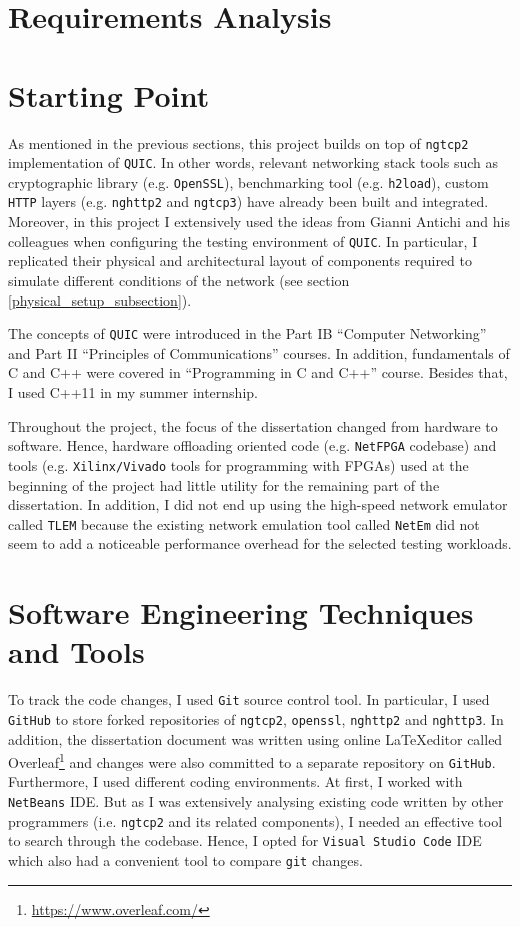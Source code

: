 \documentclass[12pt,a4paper,twoside,openright]{report}
\begin{document}
\section{Requirements Analysis}


\section{Starting Point}
As mentioned in the previous sections, this project builds on top of \texttt{ngtcp2} implementation of \texttt{QUIC}.
In other words, relevant networking stack tools such as cryptographic library (e.g. \texttt{OpenSSL}), benchmarking tool (e.g. \texttt{h2load}), custom \texttt{HTTP} layers (e.g. \texttt{nghttp2} and \texttt{ngtcp3}) have already been built and integrated. 
Moreover, in this project I extensively used the ideas from  Gianni Antichi and his colleagues \cite{Making_QUIC_Quicker} when configuring the testing environment of \texttt{QUIC}.
In particular, I replicated their physical and architectural layout of components required to simulate different conditions of the network (see section \ref{physical_setup_subsection}).

The concepts of \texttt{QUIC} were introduced in the Part IB \enquote{Computer Networking} and Part II \enquote{Principles of Communications} courses.
In addition, fundamentals of C and C++ were covered in \enquote{Programming in C and C++} course. 
Besides that, I used C++11 in my summer internship.

Throughout the project, the focus of the dissertation changed from hardware to software.
Hence, hardware offloading oriented code (e.g. \texttt{NetFPGA} codebase) and tools (e.g. \texttt{Xilinx/Vivado} tools for programming with FPGAs) used at the beginning of the project had little utility for the remaining part of the dissertation.
In addition, I did not end up using the high-speed network emulator called \texttt{TLEM} \cite{TLEM_tool} because the existing network emulation tool called \texttt{NetEm} did not seem to add a noticeable performance overhead for the selected testing workloads.


\section{Software Engineering Techniques and Tools}
    To track the code changes, I used \texttt{Git} source control tool.
    In particular, I used \texttt{GitHub} to store forked repositories of \texttt{ngtcp2}, \texttt{openssl}, \texttt{nghttp2} and \texttt{nghttp3}.
    In addition, the dissertation document was written using online \LaTeX  editor called Overleaf\footnote{\url{https://www.overleaf.com/}} and changes were also committed to a separate repository on \texttt{GitHub}.
    Furthermore, I used different coding environments.
    At first, I worked with \texttt{NetBeans} IDE.
    But as I was extensively analysing existing code written by other programmers (i.e. \texttt{ngtcp2} and its related components), I needed an effective tool to search through the codebase.
    Hence, I opted for \texttt{Visual Studio Code} IDE which also had a convenient tool to compare \texttt{git} changes.
    
\end{document}
